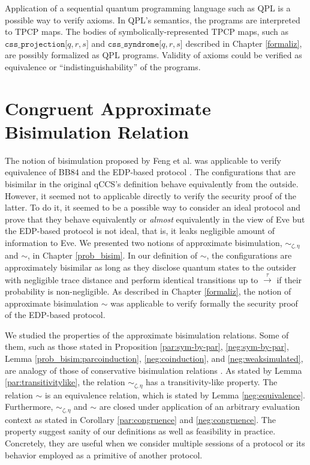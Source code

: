 Application of a sequential quantum programming language such as 
QPL \cite{Selinger2004} is a possible way to verify axioms.
In QPL's semantics, the programs are interpreted to TPCP maps.
The bodies of symbolically-represented TPCP maps, such as 
$\mathtt{css\_projection[}q,r,s\mathtt{]}$ and
$\mathtt{css\_syndrome[}q,r,s\mathtt{]}$ described in Chapter
\ref{formaliz},
are possibly formalized as QPL programs. Validity of axioms could be
verified as equivalence or ``indistinguishability'' of the programs.

\section{Congruent Approximate Bisimulation Relation}
The notion of bisimulation proposed by Feng et al. \cite{DengFeng2012}
was applicable to verify equivalence of BB84 and the EDP-based protocol
\cite{Kubota2012}. The configurations that are bisimilar in the original
qCCS's definition behave equivalently from the outside.
However, it seemed not to applicable directly 
to verify the security proof of the latter. To do it, 
it seemed to be a possible way 
to consider an ideal protocol and prove that 
they behave equivalently or 
{\it almost} equivalently in the view of Eve 
but the EDP-based protocol is not
ideal, that is, it leaks negligible amount of information to Eve.
We presented two notions of approximate bisimulation, 
$\sim_{\zeta, \eta}$ and $\sim$, in Chapter \ref{prob_bisim}.
In our definition of $\sim$,
the configurations are approximately bisimilar as
long as they disclose quantum states to the outsider with negligible
trace distance and perform identical transitions up to
$\xrightarrow{\tau}$ if their probability is non-negligible.
As described in Chapter \ref{formaliz}, the notion of approximate
bisimulation $\sim$
was applicable to verify formally
the security proof of the EDP-based protocol.

We studied the properties of the approximate bisimulation relations.
Some of them, 
such as those stated in Proposition \ref{par:sym-by-par}, \ref{neg:sym-by-par}, Lemma
\ref{prob_bisim:parcoinduction}, \ref{neg:coinduction}, and \ref{neg:weaksimulated},
are analogy of those of conservative bisimulation relations \cite{Milner1999,
FengDuanYing2011, DengFeng2012}. 
As stated by Lemma \ref{par:transitivitylike}, the relation
$\sim_{\zeta, \eta}$ has a transitivity-like property. The relation $\sim$
is an equivalence relation, which is stated by Lemma
\ref{neg:equivalence}.
Furthermore, $\sim_{\zeta, \eta}$ and $\sim$ are closed under
application of an arbitrary
evaluation context as stated in Corollary \ref{par:congruence} and
\ref{neg:congruence}. The property suggest sanity of our definitions as
well as feasibility in practice. Concretely, they are useful when
we consider multiple sessions of a protocol or its behavior employed
as a primitive of another protocol.

